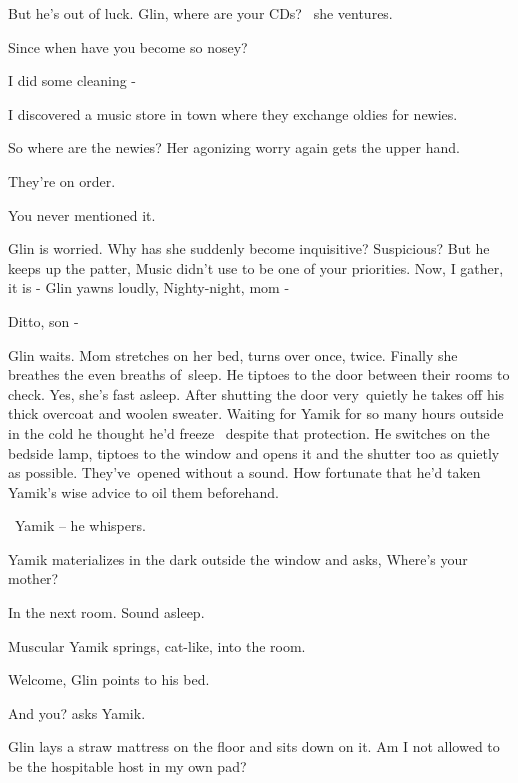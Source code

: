 \documentclass[letterpaper]{article}
\begin{document}
But he's out of luck. {\textquotedbl}Glin, where are your CDs?{\textquotedbl} \ she ventures.

{\textquotedbl}Since when have you become so nosey?{\textquotedbl} 

{\textquotedbl}I did some cleaning -{\textquotedbl} 

{\textquotedbl}I discovered a music store in town where they exchange oldies for newies.{\textquotedbl} 

{\textquotedbl}So where are the newies?{\textquotedbl} Her agonizing worry again gets the upper hand.

{\textquotedbl}They're on order.{\textquotedbl} 

{\textquotedbl}You never mentioned it.{\textquotedbl} 

Glin is worried. Why has she suddenly become inquisitive? Suspicious? But he keeps up the patter, {\textquotedbl}Music
didn't use to be one of your priorities. Now, I gather, it is -{\textquotedbl} Glin yawns
loudly{,} {\textquotedbl}Nighty-night, mom -{\textquotedbl} 

{\textquotedbl}Ditto, son -{\textquotedbl}

Glin waits. Mom stretches on her bed, turns over once, twice. Finally she breathes the even breaths of~sleep. He tiptoes
to the door between their rooms to check. Yes, she's fast asleep. After shutting the door very~quietly he takes off his
thick overcoat and woolen sweater. Waiting for Yamik for so many hours outside in the cold he thought he'd freeze
\ despite that protection. He switches on the bedside lamp, tiptoes to the window and opens it and the shutter too as
quietly as possible. They've~opened without a sound. How fortunate that
h{e}{}'d taken{ }Yamik's wise advice to
oil them beforehand.

\ {\textquotedbl}Yamik --{\textquotedbl} he whispers.

Yamik materializes in the dark outside the window and asks, {\textquotedbl}Where's your mother?{\textquotedbl} 

{\textquotedbl}In the next room. Sound asleep.{\textquotedbl} 

Muscular Yamik springs, cat-like, into the room. 

{\textquotedbl}Welcome,{\textquotedbl} Glin points to his bed. 

{\textquotedbl}And you?{\textquotedbl} asks Yamik.~ 

Glin lays a straw mattress on the floor and sits down on it. {\textquotedbl}Am I not allowed to be the hospitable host
in my own pad?{\textquotedbl}
\end{document}
